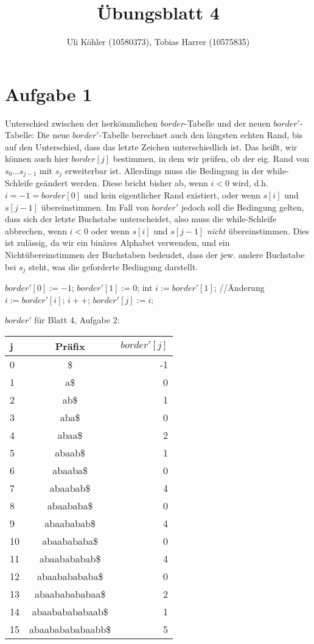 \documentclass[a4paper,10pt,oneside,leqno]{scrartcl}
\title{Übungsblatt 4}
\author{Uli Köhler (10580373), Tobias Harrer (10575835)}
\begin{document}
\maketitle

\section*{Aufgabe 1}
Unterschied zwischen der herkömmlichen $border$-Tabelle und der neuen $border'$-Tabelle: Die neue $border'$-Tabelle berechnet auch den
längsten echten Rand, bis auf den Unterschied, dass das letzte Zeichen unterschiedlich ist. Das heißt, wir können auch hier $border[j]$
bestimmen, in dem wir prüfen, ob der eig. Rand von $s_0...s_{j-1}$ mit $s_j$ erweiterbar ist. Allerdings muss die Bedingung in der while-
Schleife geändert werden. Diese bricht bisher ab, wenn $i<0$ wird, d.h. $i=-1=border[0]$ und kein eigentlicher Rand existiert, oder wenn
$s[i]$ und $s[j-1]$ übereinstimmen. Im Fall von $border'$ jedoch soll die Bedingung gelten, dass sich der letzte Buchstabe unterscheidet,
also muss die while-Schleife abbrechen, wenn $i<0$ oder wenn $s[i]$ und $s[j-1]$ \textit{nicht} übereinstimmen. Dies ist zulässig, da wir
ein binäres Alphabet verwenden, und ein Nichtübereinstimmen der Buchstaben bedeudet, dass der jew. andere Buchstabe bei $s_j$ steht, was die
geforderte Bedingung darstellt.
\begin{algorithmic}
\State $border'[0] := -1$;
\State $border'[1] := 0$;
\State int $i := border'[1]$;
  //Änderung
    \State $i := border'[i]$;
  \EndWhile
  \State $i++$;
  \State $border'[j] := i;$
\EndFor
\EndFunction
\end{algorithmic}
$border'$ für Blatt 4, Aufgabe 2:\newline
\begin{tabular}{l|c|r}
\textbf{j} & \textbf{Präfix} & \textbf{$border'[j]$}\\\hline
0 &\$ & -1\\
1 &a\$ & 0\\
2 &ab\$ & 1\\
3 &aba\$ & 0\\
4 &abaa\$ &  2\\
5 &abaab\$  & 1\\
6 &abaaba\$  & 0\\
7 &abaabab\$ & 4\\
8 &abaababa\$ & 0\\
9 &abaababab\$ & 4\\
10&abaabababa\$ & 0\\
11&abaabababab\$ & 4\\
12&abaababababa\$ & 0\\
13&abaababababaa\$ & 2\\
14&abaababababaab\$ & 1\\
15&abaababababaabb\$ & 5\\
\end{tabular}\newline\newline
\end{document}
